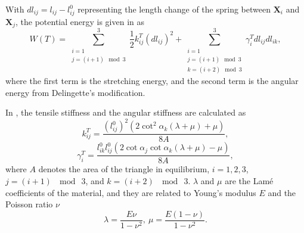 With $dl_{ij} = l_{ij} - l_{ij}^0$ representing the length change of the
spring between $\mathbf{X}_{i}$ and $\mathbf{X}_{j}$, the potential energy
is given in \cite{TriangularSM} as
\begin{equation}
W(T) = \sum_{\substack{i=1\\j=(i+1) \mod 3}}^{3}\frac{1}{2}k_{ij}^{T}(dl_{ij})^{2} + \sum_{\substack{i=1\\j=(i+1) \mod 3\\k=(i+2) \mod 3}}^{3}\gamma_{i}^{T}dl_{ij}dl_{ik}, 
\label{eqn:sm_energy}
\end{equation}
where the first term is the stretching energy, and the second term is the
angular energy from Delingette's modification.

In , the tensile stiffness and the angular stiffness are
calculated as
\begin{equation}
k_{ij}^{T} = \frac{(l_{ij}^0)^2 (2\cot^2\alpha_k(\lambda+\mu)+\mu)}{8A}, 
\label{eqn:t_stiffness}
\end{equation}
\begin{equation}
\gamma_{i}^{T} = \frac{l_{ik}^0 l_{ij}^0 (2 \cot\alpha_j \cot\alpha_k (\lambda+\mu) - \mu)}{8A},
\label{eqn:a_stiffness}
\end{equation}
where $A$ denotes the area of the triangle in equilibrium, $i = 1,2,3$,
$j = (i+1)\ \mod\ 3$, and $k = (i+2)\ \mod\ 3$.
$\lambda$ and $\mu$ are the Lam\'{e} coefficients of the material, and they
are related to Young's modulus $E$ and the Poisson ratio $\nu$ \cite{Gere2004}
\begin{equation}
\lambda=\frac{E\nu}{1-\nu^2},\ \mu=\frac{E(1-\nu)}{1-\nu^2}.
\label{eqn:Lame_coeff}
\end{equation}

